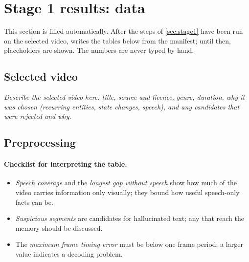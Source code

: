 \section{Stage 1 results: data}\label{sec:stage1-results}

This section is filled automatically. After the steps of \cref{sec:stage1}
have been run on the selected video,  writes the tables
below from the manifest; until then, placeholders are shown. The numbers are
never typed by hand.

\subsection{Selected video}
\textit{Describe the selected video here: title, source and licence, genre,
duration, why it was chosen (recurring entities, state changes, speech), and
any candidates that were rejected and why.}

\subsection{Preprocessing}

\paragraph{Checklist for interpreting the table.}
\begin{itemize}[nosep]
  \item \emph{Speech coverage} and the \emph{longest gap without speech} show
        how much of the video carries information only visually; they bound
        how useful speech-only facts can be.
  \item \emph{Suspicious segments} are candidates for hallucinated text; any
        that reach the memory should be discussed.
  \item The \emph{maximum frame timing error} must be below one frame period;
        a larger value indicates a decoding problem.
\end{itemize}
